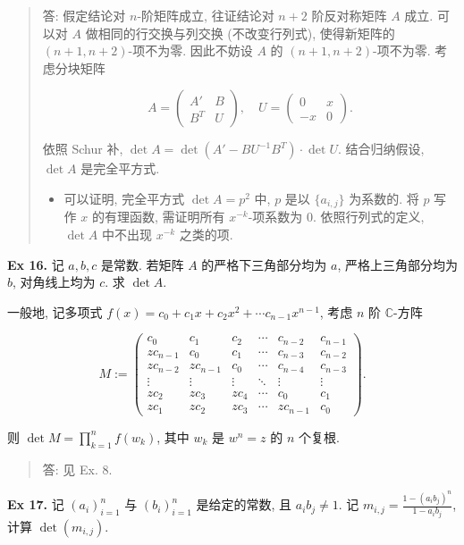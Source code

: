 \documentclass[
]{ctexart}
\begin{document}
\begin{quote}
答: 假定结论对 \(n\)-阶矩阵成立, 往证结论对 \(n+2\) 阶反对称矩阵 \(A\)
成立. 可以对 \(A\) 做相同的行交换与列交换 (不改变行列式), 使得新矩阵的
\((n+1,n+2)\)-项不为零. 因此不妨设 \(A\) 的 \((n+1,n+2)\)-项不为零.
考虑分块矩阵

\[A=\begin{pmatrix}A' &B\\B^T&U\end{pmatrix},\quad U=\begin{pmatrix}0&x\\-x&0\end{pmatrix}.\]

依照 Schur 补, \(\det A = \det (A'-BU^{-1}B^T)\cdot \det U\).
结合归纳假设, \(\det A\) 是完全平方式.

\begin{itemize}
\item
  可以证明, 完全平方式 \(\det A = p^2\) 中, \(p\) 是以 \(\{a_{i,j}\}\)
  为系数的. 将 \(p\) 写作 \(x\) 的有理函数, 需证明所有
  \(x^{-k}\)-项系数为 \(0\). 依照行列式的定义, \(\det A\) 中不出现
  \(x^{-k}\) 之类的项.
\end{itemize}
\end{quote}

\textbf{Ex 16.} 记 \(a,b,c\) 是常数. 若矩阵 \(A\) 的严格下三角部分均为
\(a\), 严格上三角部分均为 \(b\), 对角线上均为 \(c\). 求 \(\det A\).

一般地, 记多项式 \(f(x)=c_0+c_1x+c_2x^2+\cdots c_{n-1}x^{n-1}\), 考虑
\(n\) 阶 \(\mathbb C\)-方阵

\[M:=\begin{pmatrix}
c_{0} & c_{1} & c_{2} & \cdots  & c_{n-2} & c_{n-1}\\
zc_{n-1} & c_{0} & c_{1} & \cdots  & c_{n-3} & c_{n-2}\\
zc_{n-2} & zc_{n-1} & c_{0} & \cdots  & c_{n-4} & c_{n-3}\\
\vdots  & \vdots  & \vdots  & \ddots  & \vdots  & \vdots \\
zc_{2} & zc_{3} & zc_{4} & \cdots  & c_{0} & c_{1}\\
zc_{1} & zc_{2} & zc_{3} & \cdots  & zc_{n-1} & c_{0}
\end{pmatrix}.\]

则 \(\det M=\prod_{k=1}^n f(w_k)\), 其中 \(w_k\) 是 \(w^n=z\) 的 \(n\)
个复根.

\begin{quote}
答: 见 Ex. 8.
\end{quote}

\textbf{Ex 17.} 记 \((a_i)_{i=1}^n\) 与 \((b_i)_{i=1}^n\) 是给定的常数,
且 \(a_ib_j\neq 1\). 记 \(m_{i,j}=\frac{1-(a_ib_j)^n}{1-a_ib_j}\), 计算
\(\det (m_{i,j})\).
\end{document}
